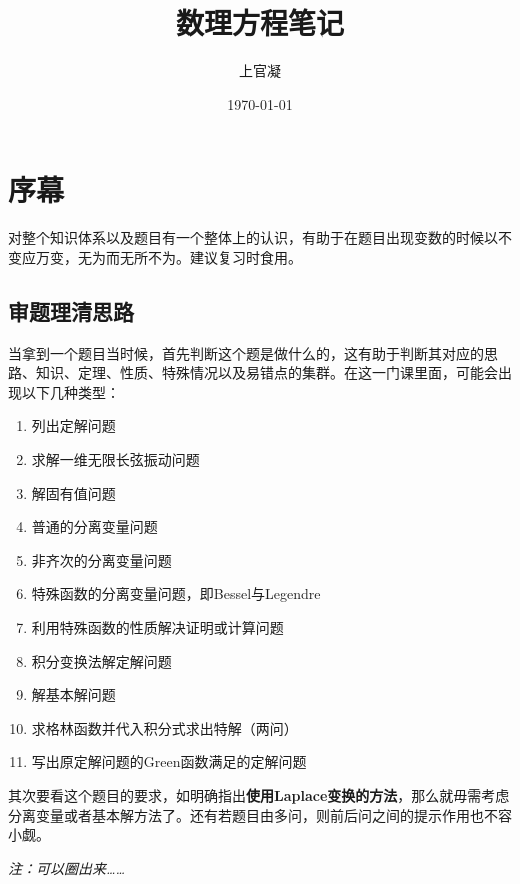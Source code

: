 \documentclass[]{report}
\title{数理方程笔记}
\author{上官凝}
\date{\today}
\begin{document}
\theoremstyle{definition} \newtheorem{theorem}{Thm}[section] %
\theoremstyle{definition} \newtheorem{definition}{Def}[section] %
\theoremstyle{plain} \newtheorem{lemma}{lemma}[section] %

	\maketitle
	\newpage
	\tableofcontents
	\newpage

	\section{序幕}
	对整个知识体系以及题目有一个整体上的认识，有助于在题目出现变数的时候以不变应万变，无为而无所不为。建议复习时食用。
		\subsection{审题理清思路}
		当拿到一个题目当时候，首先判断这个题是做什么的，这有助于判断其对应的思路、知识、定理、性质、特殊情况以及易错点的集群。在这一门课里面，可能会出现以下几种类型：\par
		\begin{enumerate}
			\item 列出定解问题
			\item 求解一维无限长弦振动问题
			\item 解固有值问题
			\item 普通的分离变量问题
			\item 非齐次的分离变量问题
			\item 特殊函数的分离变量问题，即Bessel与Legendre
			\item 利用特殊函数的性质解决证明或计算问题
			\item 积分变换法解定解问题
			\item 解基本解问题
			\item 求格林函数并代入积分式求出特解（两问）
			\item 写出原定解问题的Green函数满足的定解问题
		\end{enumerate}\par
		其次要看这个题目的要求，如明确指出\textbf{使用Laplace变换的方法}，那么就毋需考虑分离变量或者基本解方法了。还有若题目由多问，则前后问之间的提示作用也不容小觑。\par
		\textit{注：可以圈出来……}
\end{document}
